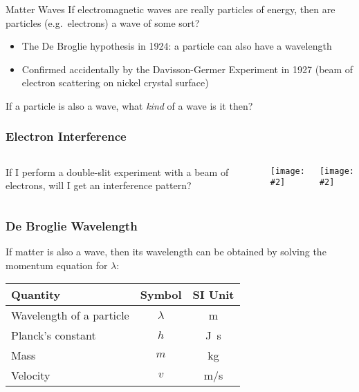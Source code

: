 \documentclass[12pt,compress,aspectratio=169]{beamer}
\newcommand{\pic}[2]{\texttt{[image: \#2]}}
\newcommand{\eq}[2]{\vspace{#1}{\Large\begin{displaymath}#2\end{displaymath}}}
\begin{document}
\begin{frame}{Matter Waves}
  If electromagnetic waves are really particles of energy, then are particles
  (e.g.\ electrons) a wave of some sort?
  \begin{itemize}
  \item The De Broglie hypothesis in 1924: a particle can also have a
    wavelength
  \item Confirmed accidentally by the Davisson-Germer Experiment in 1927 (beam
    of electron scattering on nickel crystal surface)
  \end{itemize}

  \vspace{.1in}If a particle is also a wave, what \emph{kind} of a wave is it
  then?
\end{frame}



\begin{frame}
  \frametitle{Electron Interference}
  \begin{columns}
    If I perform a double-slit experiment with a beam of electrons, will I get
    an interference pattern?
    \begin{center}
      \pic{.7}{CNX_Chem_06_03_Electrnin.png}
    \end{center}

    \pic{1}{206px-Double-slit_experiment_results_Tanamura_2.jpg}
  \end{columns}
\end{frame}



\begin{frame}
  \frametitle{De Broglie Wavelength}
  If matter is also a wave, then its wavelength can be obtained by solving the
  momentum equation for $\lambda$:

  \eq{-.2in}{
    p=\frac{h}{\lambda}\;\;\rightarrow\;\;
    \lambda=\frac{h}{p}\;\;\rightarrow\;\;\boxed{\lambda=\frac{h}{mv}}
  }

  \vspace{-.1in}
  \begin{center}
    \begin{tabular}{l|c|c}
      \rowcolor{pink}
      \textbf{Quantity} & \textbf{Symbol} & \textbf{SI Unit} \\ \hline
      Wavelength of a particle & $\lambda$ & \si{\metre} \\
      Planck's constant & $h$  & \si{\joule.\second} \\
      Mass              & $m$  & \si{\kilo\gram} \\
      Velocity          & $v$  & \si{\metre/\second}
    \end{tabular}
  \end{center}
\end{frame}
\end{document}

